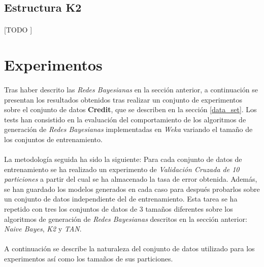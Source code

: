 \documentclass{article}
\begin{document}
		\subsection{Estructura K2}
		\label{sec:structure_K2}

			\paragraph{}
			[TODO ]



	\section{Experimentos}
	\label{sec:experiments}

		\paragraph{}
		Tras haber descrito las \emph{Redes Bayesianas} en la sección anterior, a continuación se presentan los resultados obtenidos tras realizar un conjunto de experimentos sobre el conjunto de datos \textbf{Credit}, que se describen en la sección \ref{data_set}. Los tests han consistido en la evaluación del comportamiento de los algoritmos de generación de \emph{Redes Bayesianas} implementadas en \emph{Weka} \cite{tool:weka} variando el tamaño de los conjuntos de entrenamiento.

		\paragraph{}
		La metodología seguida ha sido la siguiente: Para cada conjunto de datos de entrenamiento se ha realizado un experimento de \emph{Validación Cruzada de 10 particiones} a partir del cual se ha almacenado la tasa de error obtenida. Además, se han guardado los modelos generados en cada caso para después probarlos sobre un conjunto de datos independiente del de entrenamiento. Esta tarea se ha repetido con tres los conjuntos de datos de 3 tamaños diferentes sobre los algoritmos de generación de \emph{Redes Bayesianas} descritos en la sección anterior: \emph{Naive Bayes}, \emph{K2} y \emph{TAN}.

		\paragraph{}
		A continuación se describe la naturaleza del conjunto de datos utilizado para los experimentos así como los tamaños de sus particiones.
\end{document}
